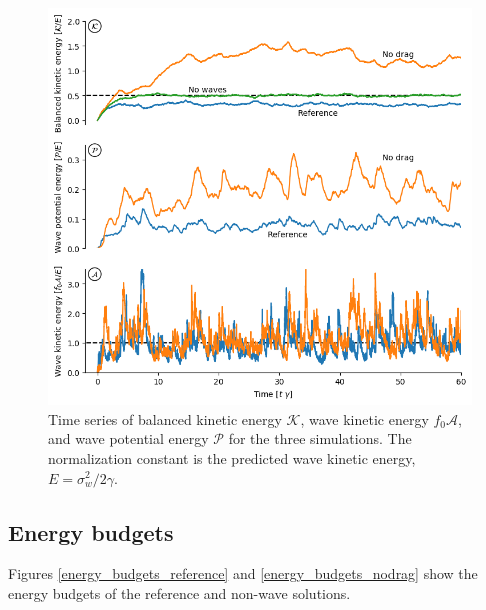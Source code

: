 \documentclass[12pt]{article}
\newcommand{\A}{\mathscr{A}}
\newcommand{\K}{\mathscr{K}}
\renewcommand{\P}{\mathscr{P}}
\newcommand{\?}{\stackrel{?}{=}}
\begin{document}
\begin{figure}
\centering
\includegraphics[width=.825\textwidth]{figs/energies_comparison.png}
\caption{Time series of balanced kinetic energy $\K$,   wave kinetic energy $f_0\A$,
          and wave potential energy $\P$ for the three simulations. The normalization
          constant is the predicted wave kinetic energy, $E = \sigma_w^2/2\gamma$.}
        \label{equilibrated_energy}
\end{figure}

\subsection{Energy budgets}
Figures \ref{energy_budgets_reference} and \ref{energy_budgets_nodrag} show the
energy budgets of the reference and non-wave solutions. 
\end{document}
